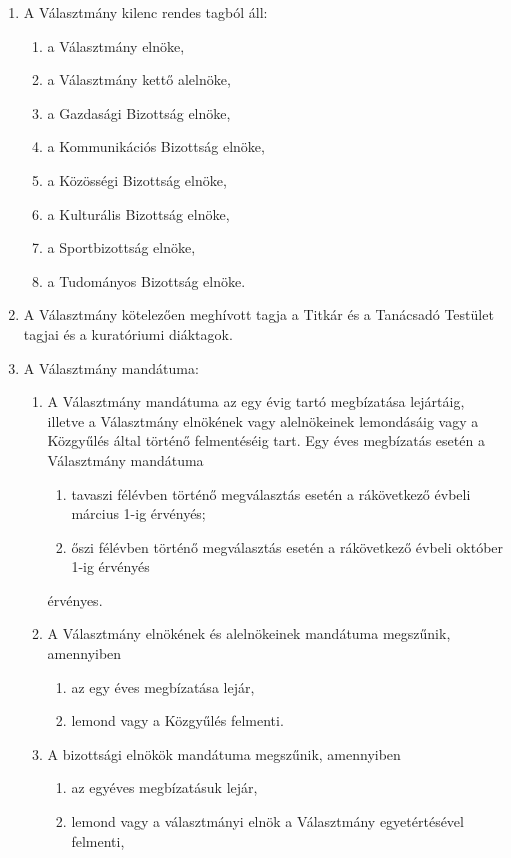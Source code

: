 \documentclass{../styles/rulebook}
\begin{document}
\begin{enumerate}
	\item A Választmány kilenc rendes tagból áll:
	\begin{enumerate}
		\item a Választmány elnöke,
		\item a Választmány kettő alelnöke,
		\item a Gazdasági Bizottság elnöke,
		\item a Kommunikációs Bizottság elnöke,
		\item a Közösségi Bizottság elnöke,
		\item a Kulturális Bizottság elnöke,
		\item a Sportbizottság elnöke,
		\item a Tudományos Bizottság elnöke.
	\end{enumerate}
	\item A Választmány kötelezően meghívott tagja a Titkár és a Tanácsadó Testület tagjai és a kuratóriumi diáktagok.
	\item A Választmány mandátuma:
	\begin{enumerate}
		\item A Választmány mandátuma az egy évig tartó megbízatása lejártáig,  illetve a Választmány elnökének vagy alelnökeinek lemondásáig vagy a Közgyűlés által történő felmentéséig tart. Egy éves megbízatás esetén a Választmány mandátuma
		\begin{enumerate}
			\item tavaszi félévben történő megválasztás esetén a rákövetkező évbeli március 1-ig érvényés;
			\item őszi félévben történő megválasztás esetén a rákövetkező évbeli október 1-ig érvényés
		\end{enumerate}
		érvényes.
		\item A Választmány elnökének és alelnökeinek mandátuma megszűnik, amennyiben
		\begin{enumerate}
			\item az egy éves megbízatása lejár,
			\item lemond vagy a Közgyűlés felmenti.
		\end{enumerate}
		\item A bizottsági elnökök mandátuma megszűnik, amennyiben
		\begin{enumerate}
			\item az egyéves megbízatásuk lejár,
			\item lemond vagy a választmányi elnök a Választmány egyetértésével felmenti,

\end{enumerate}
\end{enumerate}
\end{enumerate}
\end{document}
